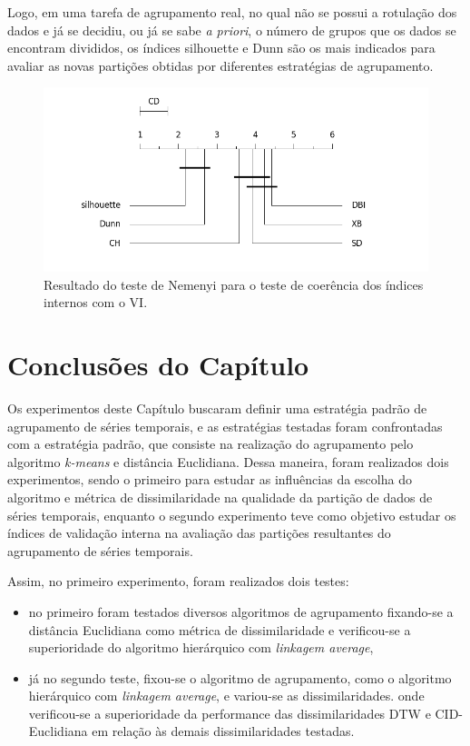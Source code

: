 Logo, em uma tarefa de agrupamento real, no qual não se possui a rotulação dos dados e já se decidiu, ou já se sabe \emph{a priori}, o número de grupos que os dados se encontram divididos, os índices silhouette e Dunn são os mais indicados para avaliar as novas partições obtidas por diferentes estratégias de agrupamento.

 \begin{figure}
 	\includegraphics[width=\linewidth]{figuras/best_coherence.png}
 	\caption{Resultado do teste de Nemenyi para o teste de coerência dos índices internos com o VI.}
 \end{figure} \label{fig:coherence}

\section{Conclusões do Capítulo}

Os experimentos deste Capítulo buscaram definir uma estratégia padrão de agrupamento de séries temporais, e as estratégias testadas foram confrontadas com a estratégia padrão, que consiste na realização do agrupamento pelo algoritmo \emph{k-means} e distância Euclidiana. Dessa maneira, foram realizados dois experimentos, sendo o primeiro para estudar as influências da escolha do algoritmo e métrica de dissimilaridade na qualidade da partição de dados de séries temporais, enquanto o segundo experimento teve como objetivo estudar os índices de validação interna na avaliação das partições resultantes do agrupamento de séries temporais.

Assim, no primeiro experimento, foram realizados dois testes:
\begin{itemize}
	\item no primeiro foram testados diversos algoritmos de agrupamento fixando-se a distância Euclidiana como métrica de dissimilaridade e verificou-se a superioridade do algoritmo hierárquico com \emph{linkagem average},
	\item já no segundo teste, fixou-se o algoritmo de agrupamento, como o algoritmo hierárquico com \emph{linkagem average}, e variou-se as dissimilaridades. onde  verificou-se a superioridade da performance das dissimilaridades DTW e CID-Euclidiana em relação às demais dissimilaridades testadas.
\end{itemize}

